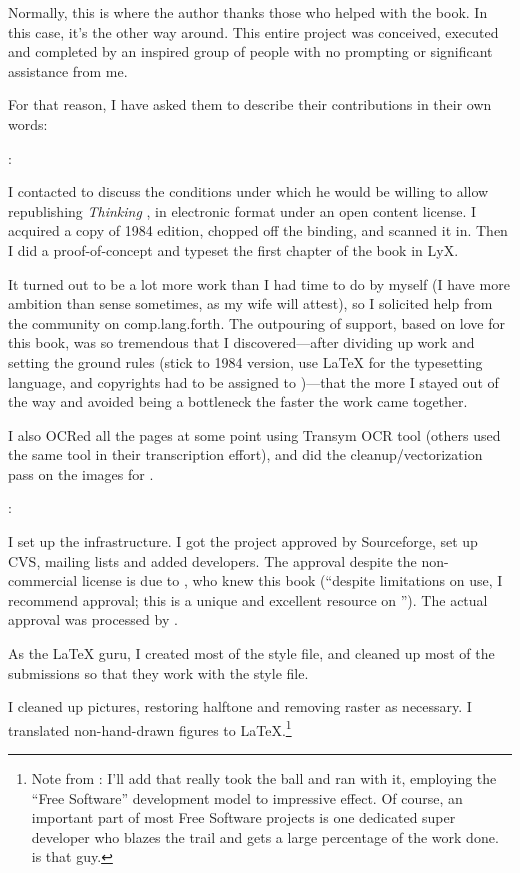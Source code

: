 Normally, this is where the author thanks those who helped with the
book. In this case, it's the other way around. This entire project was
conceived, executed and completed by an inspired group of people with
no prompting or significant assistance from me.

For that reason, I have asked them to describe their contributions in
their own words:

\begin{interview}
:

\begin{tfquot}
I contacted  to discuss the conditions under which
he would be willing to allow republishing \emph{Thinking \Forth}, in
electronic format under an open content license. I acquired a copy of
1984 edition, chopped off the binding, and scanned it in. Then I did a
proof-of-concept and typeset the first chapter of the book in LyX.

It turned out to be a lot more work than I had time to do by myself (I
have more ambition than sense sometimes, as my wife will attest), so I
solicited help from the \Forth{} community on comp.lang.forth. The
outpouring of support, based on love for this book, was so tremendous
that I discovered---after dividing up work and setting the ground
rules (stick to 1984 version, use \LaTeX{} for the typesetting
language, and copyrights had to be assigned to )---that the more I stayed out of the way and avoided being a
bottleneck the faster the work came together.

I also OCRed all the pages at some point using Transym OCR tool
(others used the same tool in their transcription effort), and did the
cleanup/vectorization pass on the images for .
\end{tfquot}
\end{interview}
\begin{interview*}
:
\begin{tfquot}
I set up the infrastructure. I got the project approved by
Sourceforge, set up CVS, mailing lists and added developers. The
approval despite the non-commercial license is due to , who knew this book (``despite limitations on use, I recommend
approval; this is a unique and excellent resource on \Forth{}''). The
actual approval was processed by .

As the \LaTeX{} guru, I created most of the style file, and cleaned up
most of the submissions so that they work with the style file.

I cleaned up pictures, restoring halftone and removing raster
as necessary. I translated non-hand-drawn figures to
\LaTeX{}.\footnote{Note from : I'll add that
 really took the ball and ran with it, employing the
``Free Software'' development model to impressive effect.  Of course, an
important part of most Free Software projects is one dedicated super
developer who blazes the trail and gets a large percentage of the work
done.   is that guy.}
\end{tfquot}
\end{interview*}
